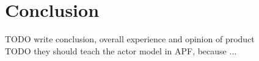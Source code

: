 \chapter{Conclusion}
TODO write conclusion, overall experience and opinion of product\\
TODO they should teach the actor model in APF, because ...\\
